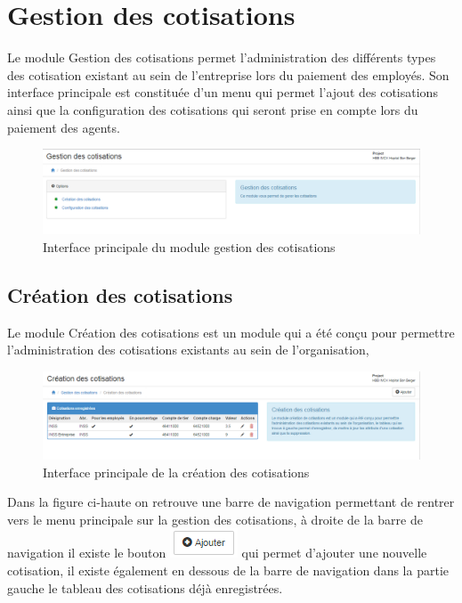 \documentclass[12pt,a4paper]{report}
\begin{document}
\newpage

\section{Gestion des cotisations}
Le module Gestion des cotisations permet l'administration des différents types des cotisation existant au sein de l'entreprise lors du paiement des employés. Son interface principale est constituée d'un menu qui permet l'ajout des cotisations ainsi que la configuration des cotisations qui seront prise en compte lors du paiement des agents.
\begin{figure}[h]
\begin{center}
\includegraphics[width=14cm]{pic/MainCotisations.png}
\end{center}
\caption{Interface principale du module gestion des cotisations}
\label{Interface principale du module gestion des cotisations}
\end{figure}

\subsection{Création des cotisations}
Le module Création des cotisations est un module qui a été conçu pour permettre l'administration des cotisations existants au sein de l'organisation,

\begin{figure}[h]
\begin{center}
\includegraphics[width=14cm]{pic/CreatCotisationInterface.png}
\end{center}
\caption{Interface principale de la création des cotisations}
\label{Interface principale de la création des cotisations}
\end{figure}

Dans la figure ci-haute on retrouve une barre de navigation permettant de rentrer vers le menu principale sur la gestion des cotisations, à droite de la barre de navigation il existe le bouton \includegraphics[scale=1]{pic/AjouterCotisation.png} qui permet d'ajouter une nouvelle cotisation, il existe également en dessous de la barre de navigation dans la partie gauche le tableau des cotisations déjà enregistrées.
\end{document}

